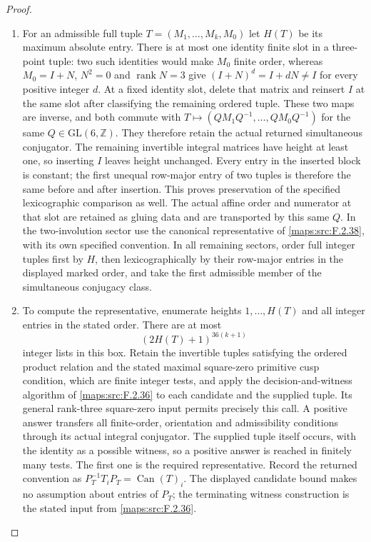 \begin{proof}
\begin{enumerate}[label=\arabic*.]
\item For an admissible full tuple $T=(M_1,\ldots,M_k,M_0)$ let
$H(T)$ be its maximum absolute entry. There is at most one identity
finite slot in a three-point tuple: two such identities would make
$M_0$ finite order, whereas $M_0=I+N$, $N^2=0$ and
$\operatorname{rank}N=3$ give $(I+N)^d=I+dN\ne I$ for every
positive integer $d$. At a fixed identity slot, delete that matrix
and reinsert $I$ at the same slot after classifying the remaining
ordered tuple. These two maps are inverse, and both commute with
$T\mapsto (QM_1Q^{-1},\ldots,QM_0Q^{-1})$ for the same
$Q\in\mathrm{GL}(6,\mathbb Z)$. They therefore retain the actual
returned simultaneous conjugator. The remaining invertible integral
matrices have height at least one, so inserting $I$ leaves height
unchanged. Every entry in the inserted block is constant; the first
unequal row-major entry of two tuples is therefore the same before
and after insertion. This proves preservation of the specified
lexicographic comparison as well. The actual affine order and
numerator at that slot are retained as gluing data and are transported
by this same $Q$. In the two-involution sector use the canonical
representative of \ref{maps:src:F.2.38}, with its own specified
convention. In all remaining sectors, order full integer tuples
first by $H$, then lexicographically by their row-major entries in
the displayed marked order, and take the first admissible member
of the simultaneous conjugacy class.

\item To compute the representative, enumerate heights
$1,\ldots,H(T)$ and all integer entries in the stated order.
There are at most
\[
 (2H(T)+1)^{36(k+1)}
 \tag{F.CN2}\label{maps:eq:F.CN2}
\]
integer lists in this box. Retain the invertible tuples satisfying
the ordered product relation and the stated maximal square-zero
primitive cusp condition, which are finite integer tests, and
apply the decision-and-witness algorithm of
\cref{maps:src:F.2.36} to each candidate and the supplied tuple.
Its general rank-three square-zero input permits precisely this
call. A positive answer transfers all finite-order, orientation
and admissibility conditions through its actual integral
conjugator. The supplied tuple itself occurs, with the identity
as a possible witness, so a positive answer is reached in
finitely many tests. The first one is the required representative.
Record the returned convention as
$P_T^{-1}T_iP_T=\operatorname{Can}(T)_i$.
The displayed candidate bound makes no assumption about entries
of $P_T$; the terminating witness construction is the stated
input from \cref{maps:src:F.2.36}.


\end{enumerate}
\end{proof}
